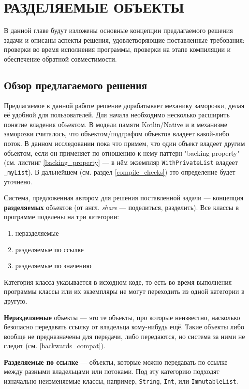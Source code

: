 \documentclass[specification,annotation,times]{itmo-student-thesis}
\begin{document}
\chapter{РАЗДЕЛЯЕМЫЕ ОБЪЕКТЫ}

В данной главе будут изложены основные концепции предлагаемого решения задачи и описаны аспекты решения, удовлетворяющие поставленные требования: проверки во время исполнения программы, проверки на этапе компиляции и обеспечение обратной совместимости.

\section{Обзор предлагаемого решения}\label{overview}

Предлагаемое в данной работе решение дорабатывает механику заморозки, делая её удобной для пользователей.
Для начала необходимо несколько расширить понятие владения объектом.
В модели памяти Kotlin/Native и в механизме заморозки считалось, что объектом/подграфом объектов владеет какой-либо поток.
В данном исследовании пока что примем, что один объект владеет другим объектом, если он применяет по отношению к нему паттерн "backing property" (см. листинг \ref{backing_property} --- в нём экземпляр \texttt{WithPrivateList} владеет \texttt{\_myList}). В дальнейшем (см. раздел \ref{compile_checks}) это определение будет уточнено.

Система, предложенная автором для решения поставленной задачи --- концепция \textbf{разделяемых} объектов (от англ. \textit{share} --- поделиться, разделить).
Все классы в программе поделены на три категории:
\begin{enumerate}
	\item неразделяемые
	\item разделяемые по ссылке
	\item разделяемые по значению
\end{enumerate}
Категория класса указывается в исходном коде, то есть во время выполнения программы классы или их экземпляры не могут переходить из одной категории в другую.

\textbf{Неразделяемые} объекты --- это те объекты, про которые неизвестно, насколько безопасно передавать ссылку от владельца кому-нибудь ещё.
Такие объекты либо вообще не предназначены для передачи, либо передаются, но система за ними не следит (см. \ref{backwards_compat}).

\textbf{Разделяемые по ссылке} --- объекты, которые можно передавать по ссылке между разными владельцами или потоками.
Под эту категорию подходят изначально неизменяемые классы, например, \texttt{String}, \texttt{Int}, или \texttt{ImmutableList}.
\end{document}
